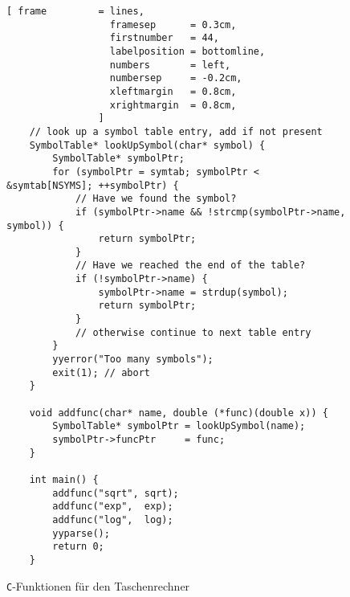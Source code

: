 \begin{figure}[!ht]
\centering
\begin{Verbatim}[ frame         = lines, 
                  framesep      = 0.3cm, 
                  firstnumber   = 44,
                  labelposition = bottomline,
                  numbers       = left,
                  numbersep     = -0.2cm,
                  xleftmargin   = 0.8cm,
                  xrightmargin  = 0.8cm,
                ]
    // look up a symbol table entry, add if not present 
    SymbolTable* lookUpSymbol(char* symbol) {
        SymbolTable* symbolPtr;    
        for (symbolPtr = symtab; symbolPtr < &symtab[NSYMS]; ++symbolPtr) {
            // Have we found the symbol? 
            if (symbolPtr->name && !strcmp(symbolPtr->name, symbol)) {
                return symbolPtr;
            }
            // Have we reached the end of the table?
            if (!symbolPtr->name) {
                symbolPtr->name = strdup(symbol);
                return symbolPtr;
            }
            // otherwise continue to next table entry
        }
        yyerror("Too many symbols");
        exit(1); // abort
    } 
    
    void addfunc(char* name, double (*func)(double x)) {
        SymbolTable* symbolPtr = lookUpSymbol(name);
        symbolPtr->funcPtr     = func;
    }
    
    int main() {
        addfunc("sqrt", sqrt);
        addfunc("exp",  exp);
        addfunc("log",  log);
        yyparse();
        return 0;
    }
\end{Verbatim}
\vspace*{-0.3cm}
\caption{\texttt{C}-Funktionen f\"ur den Taschenrechner}
\label{fig:calc-2.y}
\end{figure}

